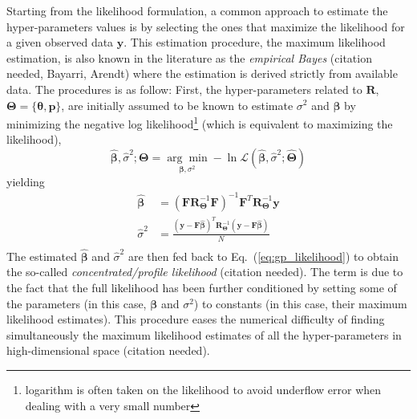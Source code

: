 Starting from the likelihood formulation, a common approach to estimate the hyper-parameters values is by selecting the ones that maximize the likelihood for a given observed data $\mathbf{y}$.
This estimation procedure, the maximum likelihood estimation, is also known in the literature as the \emph{empirical Bayes} (citation needed, Bayarri, Arendt) where the estimation is derived strictly from available data.
The procedures is as follow:
First, the hyper-parameters related to $\mathbf{R}$, $\boldsymbol{\Theta} = \{\boldsymbol{\theta}, \mathbf{p}\}$, are initially assumed to be known to estimate $\sigma^2$ and $\boldsymbol{\beta}$ by minimizing the negative log likelihood\footnote{logarithm is often taken on the likelihood to avoid underflow error when dealing with a very small number} (which is equivalent to maximizing the likelihood),
\begin{equation}
	\hat{\boldsymbol{\beta}}, \hat{\sigma}^2; \boldsymbol{\Theta} = \underset{\boldsymbol{\beta},\sigma^2}{\arg\min} - \ln \mathcal{L} (\hat{\boldsymbol{\beta}}, \hat{\sigma}^2 ; \hat{\boldsymbol{\Theta}})
\label{eq:concentrated_likelihood_1}
\end{equation} 
yielding
\begin{equation}
	\begin{split}
		\hat{\boldsymbol{\beta}} & = (\mathbf{F} \mathbf{R}_{\boldsymbol{\Theta}}^{-1} \mathbf{F})^{-1} \mathbf{F}^T \mathbf{R}_{\boldsymbol{\Theta}}^{-1} \mathbf{y} \\
		\hat{\sigma}^2           & = \frac{(\mathbf{y} - \mathbf{F} \hat{\boldsymbol{\beta}})^T \mathbf{R}_{\boldsymbol{\Theta}}^{-1} (\mathbf{y} - \mathbf{F} \hat{\boldsymbol{\beta}})}{N}\\
	\end{split}
\label{eq:beta_sigma_ml}
\end{equation}
The estimated $\hat{\boldsymbol{\beta}}$ and $\hat{\sigma}^2$ are then fed back to Eq.~(\ref{eq:gp_likelihood}) to obtain the so-called \emph{concentrated/profile likelihood} (citation needed).
The term is due to the fact that the full likelihood has been further conditioned by setting some of the parameters 
(in this case, $\boldsymbol{\beta}$ and $\sigma^2$) to constants (in this case, their maximum likelihood estimates).
This procedure eases the numerical difficulty of finding simultaneously the maximum likelihood estimates of all the hyper-parameters in high-dimensional space (citation needed).
